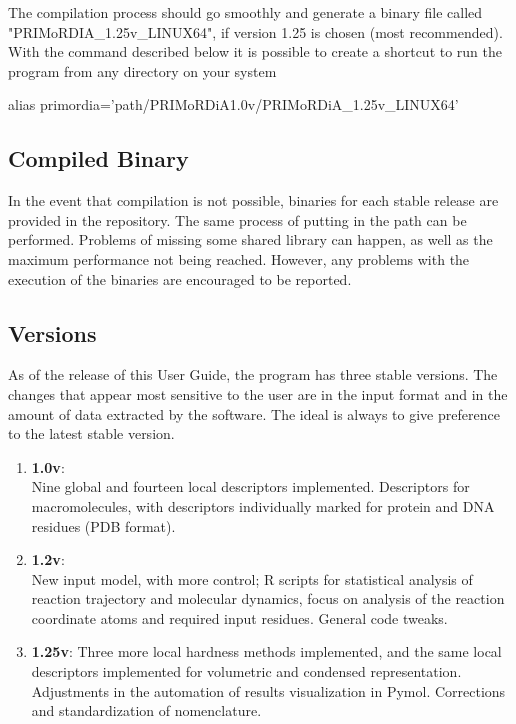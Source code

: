 \documentclass[a4paper,11pt]{refart}
\begin{document}
	The compilation process should go smoothly and generate a binary file called "PRIMoRDIA\_1.25v\_LINUX64", if version 1.25 is chosen (most recommended).
	With the command described below it is possible to create a shortcut to run the program from any directory on your system

	\hspace*{-\leftmarginwidth}
	\begin{minipage}{\fullwidth}
		\begin{commandshell}
			alias primordia='path/PRIMoRDiA1.0v/PRIMoRDiA\_1.25v\_LINUX64'
		\end{commandshell}
	\end{minipage}

	\subsection{Compiled Binary}

	In the event that compilation is not possible, binaries for each stable release are provided in the repository. The same process of putting in the path can be performed. Problems of missing some shared library can happen, as well as the maximum performance not being reached. However, any problems with the execution of the binaries are encouraged to be reported.

	\subsection{Versions}

	As of the release of this User Guide, the program has three stable versions.
	The changes that appear most sensitive to the user are in the input format and in the amount of data extracted by the software. The ideal is always to give preference to the latest stable version.

	\begin{enumerate}
		\item \textbf{1.0v}:\\
		Nine global and fourteen local descriptors implemented. Descriptors for macromolecules, with descriptors individually marked for protein and DNA residues (PDB format).
		\item \textbf{1.2v}:
		\\ New input model, with more control; R scripts for statistical analysis of reaction trajectory and molecular dynamics, focus on analysis of the reaction coordinate atoms and required input residues. General code tweaks.
		\item \textbf{1.25v}: Three more local hardness methods implemented, and the same local descriptors implemented for volumetric and condensed representation. Adjustments in the automation of results visualization in Pymol. Corrections and standardization of nomenclature.
	\end{enumerate}
\end{document}

